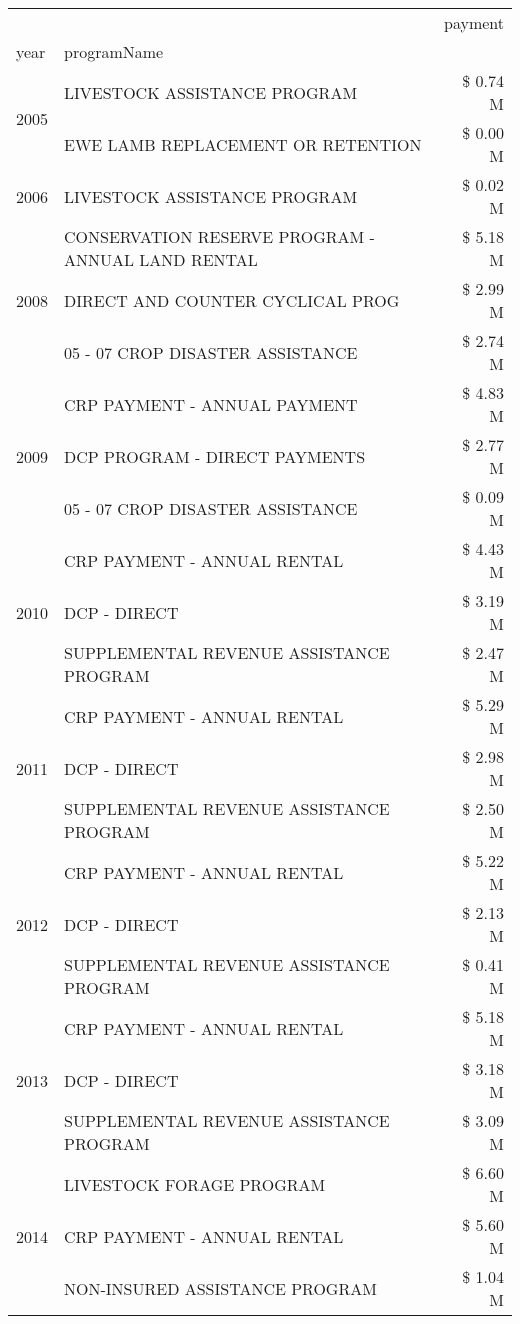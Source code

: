 \begin{tabular}{llr}
\toprule
 &  & payment \\
year & programName &  \\
\midrule
\multirow[t]{2}{*}{2005} & LIVESTOCK ASSISTANCE PROGRAM & \$ 0.74 M \\
 & EWE LAMB REPLACEMENT OR RETENTION & \$ 0.00 M \\
\cline{1-3}
2006 & LIVESTOCK ASSISTANCE PROGRAM & \$ 0.02 M \\
\cline{1-3}
\multirow[t]{3}{*}{2008} & CONSERVATION RESERVE PROGRAM - ANNUAL LAND RENTAL & \$ 5.18 M \\
 & DIRECT AND COUNTER CYCLICAL PROG & \$ 2.99 M \\
 & 05 - 07 CROP DISASTER ASSISTANCE & \$ 2.74 M \\
\cline{1-3}
\multirow[t]{3}{*}{2009} & CRP PAYMENT - ANNUAL PAYMENT & \$ 4.83 M \\
 & DCP PROGRAM - DIRECT PAYMENTS & \$ 2.77 M \\
 & 05 - 07 CROP DISASTER ASSISTANCE & \$ 0.09 M \\
\cline{1-3}
\multirow[t]{3}{*}{2010} & CRP PAYMENT - ANNUAL RENTAL & \$ 4.43 M \\
 & DCP - DIRECT & \$ 3.19 M \\
 & SUPPLEMENTAL REVENUE ASSISTANCE PROGRAM & \$ 2.47 M \\
\cline{1-3}
\multirow[t]{3}{*}{2011} & CRP PAYMENT - ANNUAL RENTAL & \$ 5.29 M \\
 & DCP - DIRECT & \$ 2.98 M \\
 & SUPPLEMENTAL REVENUE ASSISTANCE PROGRAM & \$ 2.50 M \\
\cline{1-3}
\multirow[t]{3}{*}{2012} & CRP PAYMENT - ANNUAL RENTAL & \$ 5.22 M \\
 & DCP - DIRECT & \$ 2.13 M \\
 & SUPPLEMENTAL REVENUE ASSISTANCE PROGRAM & \$ 0.41 M \\
\cline{1-3}
\multirow[t]{3}{*}{2013} & CRP PAYMENT - ANNUAL RENTAL & \$ 5.18 M \\
 & DCP - DIRECT & \$ 3.18 M \\
 & SUPPLEMENTAL REVENUE ASSISTANCE PROGRAM & \$ 3.09 M \\
\cline{1-3}
\multirow[t]{3}{*}{2014} & LIVESTOCK FORAGE PROGRAM & \$ 6.60 M \\
 & CRP PAYMENT - ANNUAL RENTAL & \$ 5.60 M \\
 & NON-INSURED ASSISTANCE PROGRAM & \$ 1.04 M \\
\cline{1-3}

\end{tabular}
